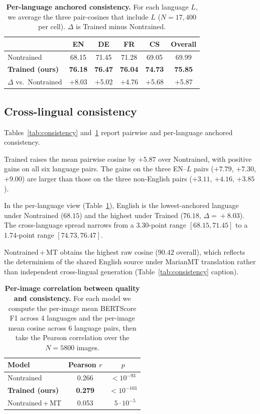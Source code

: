 \documentclass[11pt]{article}
\begin{document}
\begin{table}[t]
\centering
\caption{\textbf{Per-language anchored consistency.} For each language
$L$, we average the three pair-cosines that include $L$ ($N\!=\!17{,}400$
per cell). $\Delta$ is Trained minus Nontrained.}
\label{tab:anchored}
\small
\begin{tabular}{lccccc}
\toprule
& EN & DE & FR & CS & Overall \\
\midrule
Nontrained              & 68.15 & 71.45 & 71.28 & 69.05 & 69.99 \\
\textbf{Trained (ours)} & \textbf{76.18} & \textbf{76.47} & \textbf{76.04} & \textbf{74.73} & \textbf{75.85} \\
\midrule
$\Delta$ vs.\ Nontrained & +8.03 & +5.02 & +4.76 & +5.68 & +5.87 \\
\bottomrule
\end{tabular}
\end{table}

\subsection{Cross-lingual consistency}

Tables~\ref{tab:consistency} and~\ref{tab:anchored} report pairwise
and per-language anchored consistency.

Trained raises the mean pairwise cosine by $+5.87$ over Nontrained,
with positive gains on all six language pairs. The gains on the three
EN--$L$ pairs ($+7.79$, $+7.30$, $+9.00$) are larger than those on the
three non-English pairs ($+3.11$, $+4.16$, $+3.85$).

In the per-language view (Table~\ref{tab:anchored}), English is the
lowest-anchored language under Nontrained ($68.15$) and the highest
under Trained ($76.18$, $\Delta\!=\!+8.03$). The cross-language spread
narrows from a $3.30$-point range $[68.15, 71.45]$ to a $1.74$-point
range $[74.73, 76.47]$.

Nontrained\,+\,MT obtains the highest raw cosine ($90.42$ overall),
which reflects the determinism of the shared English source under
MarianMT translation rather than independent cross-lingual generation
(Table~\ref{tab:consistency} caption).

\begin{table}[t]
\centering
\caption{\textbf{Per-image correlation between quality and
consistency.} For each model we compute the per-image mean BERTScore
F1 across 4 languages and the per-image mean cosine across 6 language
pairs, then take the Pearson correlation over the $N\!=\!5800$ images.}
\label{tab:corr}
\small
\begin{tabular}{lcc}
\toprule
Model & Pearson $r$ & $p$ \\
\midrule
Nontrained                & 0.266 & $<10^{-93}$ \\
\textbf{Trained (ours)}   & \textbf{0.279} & $<10^{-103}$ \\
Nontrained\,+\,MT         & 0.053 & $\;\;5{\cdot}10^{-5}$ \\
\bottomrule
\end{tabular}
\end{table}
\end{document}

